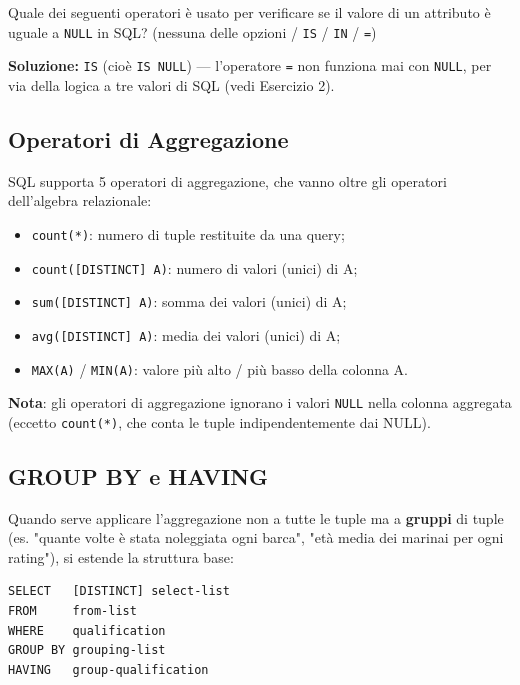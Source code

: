 \documentclass[12pt, a4paper]{article}
\begin{document}
\begin{tcolorbox}[colback=lightergray!10, colframe=tocsec, title=\textbf{Esercizio 1}]
Quale dei seguenti operatori è usato per verificare se il valore di un attributo è uguale a \texttt{NULL} in SQL? (nessuna delle opzioni / \texttt{IS} / \texttt{IN} / \texttt{=})
\end{tcolorbox}
\textbf{Soluzione:} \texttt{IS} (cioè \texttt{IS NULL}) — l'operatore \texttt{=} non funziona mai con \texttt{NULL}, per via della logica a tre valori di SQL (vedi Esercizio 2).

\subsection{Operatori di Aggregazione}

SQL supporta 5 operatori di aggregazione, che vanno oltre gli operatori dell'algebra relazionale:
\begin{itemize}
    \item \texttt{count(*)}: numero di tuple restituite da una query;
    \item \texttt{count([DISTINCT] A)}: numero di valori (unici) di A;
    \item \texttt{sum([DISTINCT] A)}: somma dei valori (unici) di A;
    \item \texttt{avg([DISTINCT] A)}: media dei valori (unici) di A;
    \item \texttt{MAX(A)} / \texttt{MIN(A)}: valore più alto / più basso della colonna A.
\end{itemize}
\textbf{Nota}: gli operatori di aggregazione ignorano i valori \texttt{NULL} nella colonna aggregata (eccetto \texttt{count(*)}, che conta le tuple indipendentemente dai NULL).

\subsection{GROUP BY e HAVING}

Quando serve applicare l'aggregazione non a tutte le tuple ma a \textbf{gruppi} di tuple (es. "quante volte è stata noleggiata ogni barca", "età media dei marinai per ogni rating"), si estende la struttura base:

\begin{verbatim}
SELECT   [DISTINCT] select-list
FROM     from-list
WHERE    qualification
GROUP BY grouping-list
HAVING   group-qualification
\end{verbatim}
\end{document}
